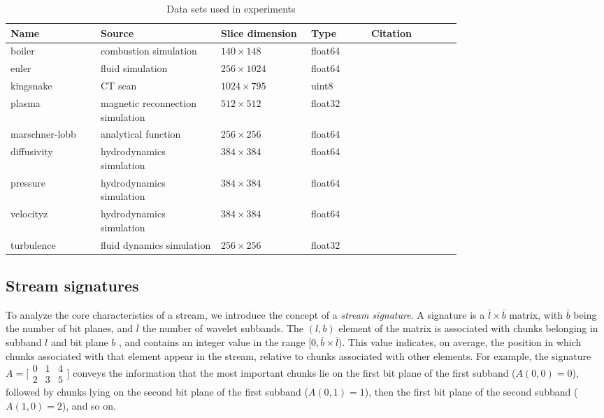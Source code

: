 \begin{table}[t]
  \caption{Data sets used in experiments}
  \centering
  \begin{tabular}{p{0.15\linewidth}p{0.20\linewidth}p{0.15\linewidth}p{0.10\linewidth}p{0.15\linewidth}}
  \hline
  Name & Source & Slice dimension & Type & Citation\\
  \hline
  boiler & combustion simulation& $140\times 148$ & float64 &\\
  euler & fluid simulation& $256\times 1024$ & float64 &\\
  kingsnake & CT scan & $1024\times 795$ & uint8 &\\
  plasma & magnetic reconnection simulation& $512\times 512$ & float32 &\\
  marschner-lobb & analytical function& $256\times 256$ & float64 &\\
  diffusivity & hydrodynamics simulation& $384\times 384$ & float64 &\\
  pressure & hydrodynamics simulation& $384\times 384$ & float64 &\\
  velocityz & hydrodynamics simulation& $384\times 384$ & float64 &\\
  turbulence & fluid dynamics simulation& $256\times 256$ & float32 &\\
  \hline
  \end{tabular}
\label{tbl:data-sets}
\end{table}

\subsection{Stream signatures}
\label{sec:stream-signature}

To analyze the core characteristics of a stream, we introduce the concept of a \emph{stream
signature}. A signature is a $\bar{l} \times \bar{b}$ matrix, with $\bar{b}$ being the number of bit
planes, and $\bar{l}$ the number of wavelet subbands. The $(l,b)$ element of the matrix is
associated with chunks belonging in subband $l$ and bit plane $b$ , and contains an integer value in
the range $[0,\bar{b}\times \bar{l})$. This value indicates, on average, the position in which
chunks associated with that element appear in the stream, relative to chunks associated with other
elements. For example, the signature  $A=\bigl[
\begin{smallmatrix}0 & 1 & 4\\ 2 & 3 & 5\end{smallmatrix}\bigr]$ conveys the information that the
most important chunks lie on the first bit plane of the first subband ($A(0,0)=0$), followed by
chunks lying on the second bit plane of the first subband ($A(0,1)=1$), then the first bit plane of
the second subband ($A(1,0)=2$), and so on.

